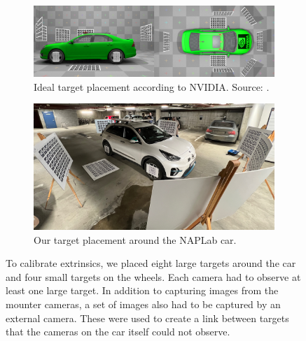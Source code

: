  \begin{figure}[htbp]
    \centering
    
    \begin{subfigure}[htbp]{\textwidth}
        \centering
        \includegraphics[width=\textwidth]{chapters/3-method/figures/calibration/nvidia-target-placement.png}
        \caption{Ideal target placement according to NVIDIA. Source: \cite{nvidia-drive-sim}.}
    \end{subfigure}

    \bigskip

    \begin{subfigure}[htbp]{\textwidth}
        \centering
        \includegraphics[width=\textwidth]{chapters/3-method/figures/calibration/extrinsics.jpeg}
        \caption{Our target placement around the NAPLab car.}
    \end{subfigure}
 
    \caption{To calibrate extrinsics, we placed eight large targets around the car and four small targets on the wheels. Each camera had to observe at least one large target. In addition to capturing images from the mounter cameras, a set of images also had to be captured by an external camera. These were used to create a link between targets that the cameras on the car itself could not observe.}
    \label{fig:calibration-extrinsics}
\end{figure}
